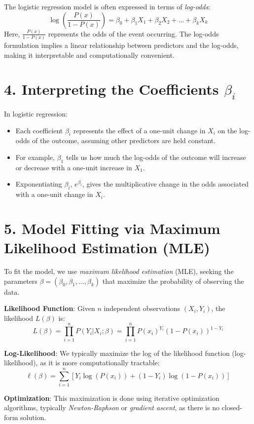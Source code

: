 \documentclass{article}
\begin{document}
The logistic regression model is often expressed in terms of \textit{log-odds}:
\[
\log \left( \frac{P(x)}{1 - P(x)} \right) = \beta_0 + \beta_1 X_1 + \beta_2 X_2 + \dots + \beta_k X_k
\]
Here, \( \frac{P(x)}{1 - P(x)} \) represents the odds of the event occurring. The log-odds formulation implies a linear relationship between predictors and the log-odds, making it interpretable and computationally convenient.

\section*{4. Interpreting the Coefficients \( \beta_i \)}

In logistic regression:
\begin{itemize}
    \item Each coefficient \( \beta_i \) represents the effect of a one-unit change in \( X_i \) on the log-odds of the outcome, assuming other predictors are held constant.
    \item For example, \( \beta_1 \) tells us how much the log-odds of the outcome will increase or decrease with a one-unit increase in \( X_1 \).
    \item Exponentiating \( \beta_i \), \( e^{\beta_i} \), gives the multiplicative change in the odds associated with a one-unit change in \( X_i \).
\end{itemize}

\section*{5. Model Fitting via Maximum Likelihood Estimation (MLE)}

To fit the model, we use \textit{maximum likelihood estimation} (MLE), seeking the parameters \( \beta = (\beta_0, \beta_1, \dots, \beta_k) \) that maximize the probability of observing the data.

\textbf{Likelihood Function}: Given \( n \) independent observations \( (X_i, Y_i) \), the likelihood \( L(\beta) \) is:
\[
L(\beta) = \prod_{i=1}^n P(Y_i | X_i; \beta) = \prod_{i=1}^n P(x_i)^{Y_i} (1 - P(x_i))^{1 - Y_i}
\]

\textbf{Log-Likelihood}: We typically maximize the log of the likelihood function (log-likelihood), as it is more computationally tractable:
\[
\ell(\beta) = \sum_{i=1}^n \left[ Y_i \log(P(x_i)) + (1 - Y_i) \log(1 - P(x_i)) \right]
\]

\textbf{Optimization}: This maximization is done using iterative optimization algorithms, typically \textit{Newton-Raphson} or \textit{gradient ascent}, as there is no closed-form solution.
\end{document}
